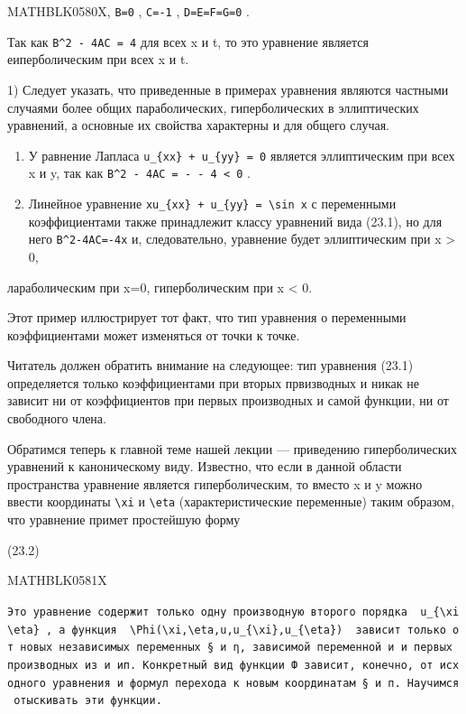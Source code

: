 \documentclass[
  ukrainian,
]{article}
\begin{document}
MATHBLK0580X, \texttt{B=0} , \texttt{C=-1} , \texttt{D=E=F=G=0} .

Так как \texttt{B\^{}2\ -\ 4AC\ =\ 4} для всех x и t, то это уравнение
является еиперболическим при всех x и t.

1) Следует указать, что приведенные в примерах уравнения являются
частными случаями более общих параболических, гиперболических в
эллиптических уравнений, а основные их свойства характерны и для общего
случая.

\begin{enumerate}
\def\labelenumi{\arabic{enumi}.}
\setcounter{enumi}{2}
\item
  У равнение Лапласа \texttt{u\_\{xx\}\ +\ u\_\{yy\}\ =\ 0} является
  эллиптическим при всех x и y, так как
  \texttt{B\^{}2\ -\ 4AC\ =\ -\ -\ 4\ \textless{}\ 0} .
\item
  Линейное уравнение
  \texttt{xu\_\{xx\}\ +\ u\_\{yy\}\ =\ \textbackslash{}sin\ x} с
  переменными коэффициентами также принадлежит классу уравнений вида
  (23.1), но для него \texttt{B\^{}2-4AC=-4x} и, следовательно,
  уравнение будет эллиптическим при x \textgreater{} 0,
\end{enumerate}

лараболическим при x=0, гиперболическим при x \textless{} 0.

Этот пример иллюстрирует тот факт, что тип уравнения о переменными
коэффициентами может изменяться от точки к точке.

Читатель должен обратить внимание на следующее: тип уравнения (23.1)
определяется только коэффициентами при вторых првизводных и никак не
зависит ни от коэффициентов при первых производных и самой функции, ни
от свободного члена.

Обратимся теперь к главной теме нашей лекции --- приведению
гиперболических уравнений к каноническому виду. Известно, что если в
данной области пространства уравнение является гиперболическим, то
вместо x и y можно ввести координаты \texttt{\textbackslash{}xi} и
\texttt{\textbackslash{}eta} (характеристические переменные) таким
образом, что уравнение примет простейшую форму

(23.2)

MATHBLK0581X

\texttt{Это\ уравнение\ содержит\ только\ одну\ производную\ второго\ порядка\ \ \textquotesingle{}u\_\{\textbackslash{}xi\textbackslash{}eta\}\textquotesingle{}\ ,\ а\ функция\ \ \textquotesingle{}\textbackslash{}Phi(\textbackslash{}xi,\textbackslash{}eta,u,u\_\{\textbackslash{}xi\},u\_\{\textbackslash{}eta\})\textquotesingle{}\ \ зависит\ только\ от\ новых\ независимых\ переменных\ §\ и\ η,\ зависимой\ переменной\ и\ и\ первых\ производных\ из\ и\ ип.\ Конкретный\ вид\ функции\ Ф\ зависит,\ конечно,\ от\ исходного\ уравнения\ и\ формул\ перехода\ к\ новым\ координатам\ §\ и\ п.\ Научимся\ отыскивать\ эти\ функции.}
\end{document}
